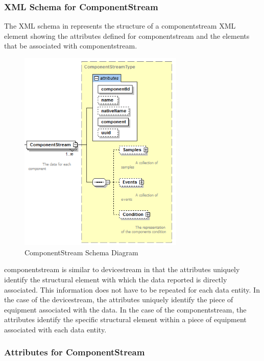 \subsubsection{XML Schema for ComponentStream}

The XML schema in  represents the structure of a \gls{componentstream} XML element showing the attributes defined for \gls{componentstream} and the elements that \may be associated with \gls{componentstream}.

\begin{figure}[ht]
  \centering
  \includegraphics[width=0.7\textwidth]{figures/componentstream-schema-diagram.png}
  \caption{ComponentStream Schema Diagram}
  \label{fig:componentstream-schema-diagram}
\end{figure}

\FloatBarrier

\gls{componentstream} is similar to \gls{devicestream} in that the attributes uniquely identify the \gls{structural element} with which the data reported is directly associated.  This information does not have to be repeated for each \gls{data entity}.   In the case of the \gls{devicestream}, the attributes uniquely identify the piece of equipment associated with the data.   In the case of the \gls{componentstream}, the attributes identify the specific \gls{structural element} within a piece of equipment associated with each \gls{data entity}.  

\subsubsection{Attributes for ComponentStream}

